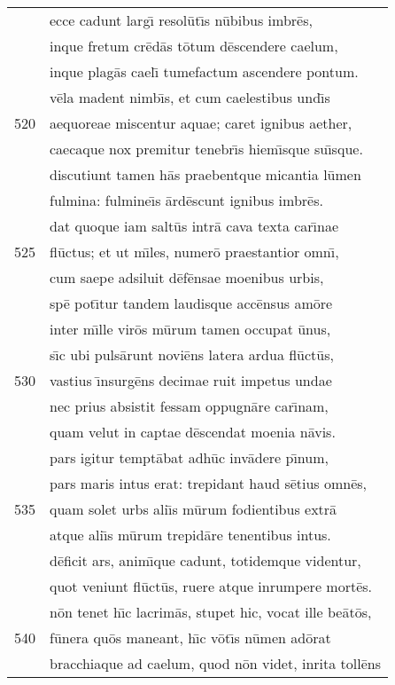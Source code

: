 \documentclass[paper=6in:9in,pagesize=pdftex,
               headinclude=on,footinclude=on,12pt]{scrbook}
\begin{document}
\begin{longtable}[p]{ r l }
 & ecce cadunt larg\={\i} resol\=ut\={\i}s n\=ubibus imbr\=es,\\ 
 & inque fretum cr\=ed\=as t\=otum d\=escendere caelum,\\ 
 & inque plag\=as cael\={\i} tumefactum ascendere pontum.\\ 
 & v\=ela madent nimb\={\i}s, et cum caelestibus und\={\i}s\\ 
520 & aequoreae miscentur aquae; caret ignibus aether,\\ 
 & caecaque nox premitur tenebr\={\i}s hiem\={\i}sque su\={\i}sque.\\ 
 & discutiunt tamen h\=as praebentque micantia l\=umen\\ 
 & fulmina: fulmine\={\i}s \=ard\=escunt ignibus imbr\=es.\\ 
 & dat quoque iam salt\=us intr\=a cava texta car\={\i}nae\\ 
525 & fl\=uctus; et ut m\={\i}les, numer\=o praestantior omn\={\i},\\ 
 & cum saepe adsiluit d\=ef\=ensae moenibus urbis,\\ 
 & sp\=e pot\={\i}tur tandem laudisque acc\=ensus am\=ore\\ 
 & inter m\={\i}lle vir\=os m\=urum tamen occupat \=unus,\\ 
 & s\={\i}c ubi puls\=arunt novi\=ens latera ardua fl\=uct\=us,\\ 
530 & vastius \={\i}nsurg\=ens decimae ruit impetus undae\\ 
 & nec prius absistit fessam oppugn\=are car\={\i}nam,\\ 
 & quam velut in captae d\=escendat moenia n\=avis.\\ 
 & pars igitur tempt\=abat adh\=uc inv\=adere p\={\i}num,\\ 
 & pars maris intus erat: trepidant haud s\=etius omn\=es,\\ 
535 & quam solet urbs ali\={\i}s m\=urum fodientibus extr\=a\\ 
 & atque ali\={\i}s m\=urum trepid\=are tenentibus intus.\\ 
 & d\=eficit ars, anim\={\i}que cadunt, totidemque videntur,\\ 
 & quot veniunt fl\=uct\=us, ruere atque inrumpere mort\=es.\\ 
 & n\=on tenet h\={\i}c lacrim\=as, stupet hic, vocat ille be\=at\=os,\\ 
540 & f\=unera qu\=os maneant, h\={\i}c v\=ot\={\i}s n\=umen ad\=orat\\ 
 & bracchiaque ad caelum, quod n\=on videt, inrita toll\=ens\\ 

\end{longtable}
\end{document}
